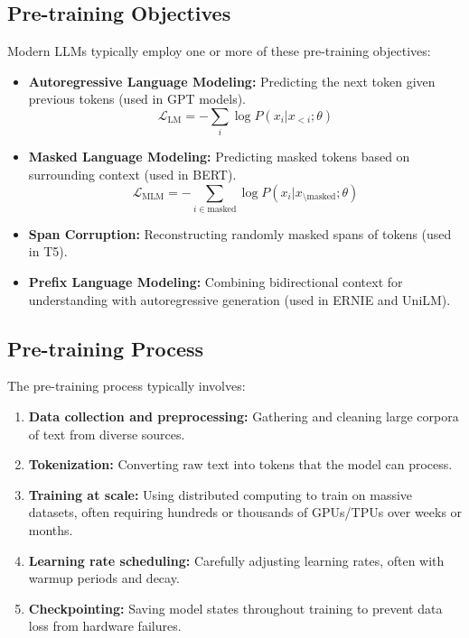 \documentclass[11pt,a4paper]{report}
\begin{document}
\subsection{Pre-training Objectives}
Modern LLMs typically employ one or more of these pre-training objectives:

\begin{itemize}
    \item \textbf{Autoregressive Language Modeling:} Predicting the next token given previous tokens (used in GPT models).
    \begin{equation}
    \mathcal{L}_{\text{LM}} = -\sum_{i} \log P(x_i | x_{<i}; \theta)
    \end{equation}
    
    \item \textbf{Masked Language Modeling:} Predicting masked tokens based on surrounding context (used in BERT).
    \begin{equation}
    \mathcal{L}_{\text{MLM}} = -\sum_{i \in \text{masked}} \log P(x_i | x_{\setminus \text{masked}}; \theta)
    \end{equation}
    
    \item \textbf{Span Corruption:} Reconstructing randomly masked spans of tokens (used in T5).
    
    \item \textbf{Prefix Language Modeling:} Combining bidirectional context for understanding with autoregressive generation (used in ERNIE and UniLM).
\end{itemize}

\subsection{Pre-training Process}
The pre-training process typically involves:

\begin{enumerate}
    \item \textbf{Data collection and preprocessing:} Gathering and cleaning large corpora of text from diverse sources.
    
    \item \textbf{Tokenization:} Converting raw text into tokens that the model can process.
    
    \item \textbf{Training at scale:} Using distributed computing to train on massive datasets, often requiring hundreds or thousands of GPUs/TPUs over weeks or months.
    
    \item \textbf{Learning rate scheduling:} Carefully adjusting learning rates, often with warmup periods and decay.
    
    \item \textbf{Checkpointing:} Saving model states throughout training to prevent data loss from hardware failures.
\end{enumerate}
\end{document}
